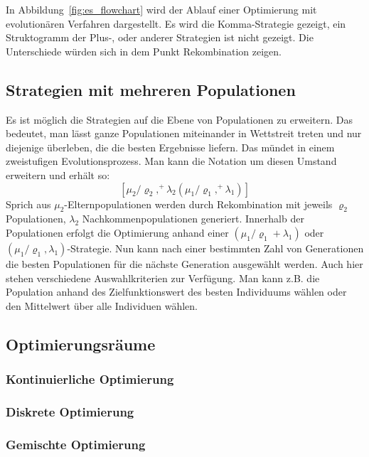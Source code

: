 In Abbildung~\ref{fig:es_flowchart} wird der Ablauf einer Optimierung mit evolutionären Verfahren dargestellt. Es wird die Komma-Strategie gezeigt, ein Struktogramm der Plus-, oder anderer Strategien ist nicht gezeigt. Die Unterschiede würden sich in dem Punkt Rekombination zeigen.
%
\subsection{Strategien mit mehreren Populationen}
Es ist möglich die Strategien auf die Ebene von Populationen zu erweitern. Das bedeutet, man lässt ganze Populationen miteinander in Wettstreit treten und nur diejenige überleben, die die besten Ergebnisse liefern. Das mündet in einem zweistufigen Evolutionsprozess. Man kann die Notation um diesen Umstand erweitern und erhält so:
$$
[\mu_2/\varrho_2,^{+}\lambda_2(\mu_1/\varrho_1,^{+}\lambda_1)]
$$
Sprich aus $\mu_2$-Elternpopulationen werden durch Rekombination mit jeweils $\varrho_2$ Populationen, $\lambda_2$ Nachkommenpopulationen generiert. Innerhalb der Populationen erfolgt die Optimierung anhand einer $({\mu_1}/{\varrho_1}+\lambda_1)$ oder $({\mu_1}/{\varrho_1},\lambda_1)$-Strategie. Nun kann nach einer bestimmten Zahl von Generationen die besten Populationen für die nächste Generation ausgewählt werden. Auch hier stehen verschiedene Auswahlkriterien zur Verfügung. Man kann z.B. die Population anhand des Zielfunktionswert des besten Individuums wählen oder den Mittelwert über alle Individuen wählen.
%
\subsection{Optimierungsräume}
\lipsum[1]
%
\subsubsection{Kontinuierliche Optimierung}
%
\lipsum[1]
%
\subsubsection{Diskrete Optimierung}
%
\lipsum[1]
%
\subsubsection{Gemischte Optimierung}
%
\lipsum[1]
%

